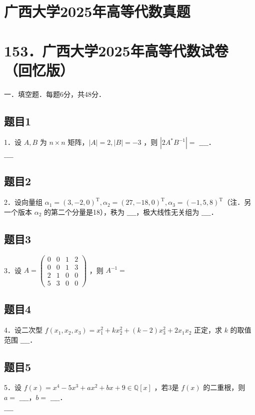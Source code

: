 \documentclass{article}
\begin{document}
\section*{广西大学2025年高等代数真题}
\section*{153．广西大学2025年高等代数试卷（回忆版）}
一．填空题．每题6分，共48分．\\

\subsection{题目1}
1．设 \(A, B\) 为 \(n \times n\) 矩阵，\(|A|=2,|B|=-3\) ，则 \(\left|2 A^{*} B^{-1}\right|=\) \(\_\_\_\_\)．\\
\(\_\_\_\_\)

\subsection{题目2}
2．设向量组 \(\alpha_{1}=(3,-2,0)^{\mathrm{T}}, \alpha_{2}=(27,-18,0)^{\mathrm{T}}, \alpha_{3}=(-1,5,8)^{\mathrm{T}}\)（注．另一个版本 \(\alpha_{2}\) 的第二个分量是18），秩为 \(\_\_\_\_\)，极大线性无关组为 \(\_\_\_\_\)．

\subsection{题目3}
3．设 \(A=\left(\begin{array}{llll}0 & 0 & 1 & 2 \\ 0 & 0 & 1 & 3 \\ 2 & 1 & 0 & 0 \\ 5 & 3 & 0 & 0\end{array}\right)\) ，则 \(A^{-1}=\)

\subsection{题目4}
4．设二次型 \(f\left(x_{1}, x_{2}, x_{3}\right)=x_{1}^{2}+k x_{2}^{2}+(k-2) x_{3}^{2}+2 x_{1} x_{2}\) 正定，求 \(k\) 的取值范围 \(\_\_\_\_\)．

\subsection{题目5}
5．设 \(f(x)=x^{4}-5 x^{3}+a x^{2}+b x+9 \in \mathbb{Q}[x]\) ，若3是 \(f(x)\) 的二重根，则 \(a=\) \(\_\_\_\_\)，\(b=\) \(\_\_\_\_\)．\\
\(\_\_\_\_\)
\end{document}
